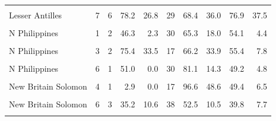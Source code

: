 \begin{ThreePartTable}
\begin{longtable}[t]{lrrrrrrrrr}
\cellcolor{gray!6}{Lesser Antilles} & \cellcolor{gray!6}{6} & \cellcolor{gray!6}{24} & \cellcolor{gray!6}{74.4} & \cellcolor{gray!6}{89.3} & \cellcolor{gray!6}{17} & \cellcolor{gray!6}{68.6} & \cellcolor{gray!6}{83.1} & \cellcolor{gray!6}{98.0} & \cellcolor{gray!6}{90.7}\\
Lesser Antilles & 7 & 6 & 78.2 & 26.8 & 29 & 68.4 & 36.0 & 76.9 & 37.5\\
\cellcolor{gray!6}{Lesser Antilles} & \cellcolor{gray!6}{8} & \cellcolor{gray!6}{14} & \cellcolor{gray!6}{54.5} & \cellcolor{gray!6}{32.0} & \cellcolor{gray!6}{47} & \cellcolor{gray!6}{64.9} & \cellcolor{gray!6}{21.0} & \cellcolor{gray!6}{60.3} & \cellcolor{gray!6}{27.8}\\
N Philippines & 1 & 2 & 46.3 & 2.3 & 30 & 65.3 & 18.0 & 54.1 & 4.4\\
\cellcolor{gray!6}{N Philippines} & \cellcolor{gray!6}{2} & \cellcolor{gray!6}{3} & \cellcolor{gray!6}{44.0} & \cellcolor{gray!6}{3.3} & \cellcolor{gray!6}{20} & \cellcolor{gray!6}{71.6} & \cellcolor{gray!6}{26.2} & \cellcolor{gray!6}{54.7} & \cellcolor{gray!6}{6.5}\\
N Philippines & 3 & 2 & 75.4 & 33.5 & 17 & 66.2 & 33.9 & 55.4 & 7.8\\
\cellcolor{gray!6}{N Philippines} & \cellcolor{gray!6}{4} & \cellcolor{gray!6}{5} & \cellcolor{gray!6}{23.0} & \cellcolor{gray!6}{7.0} & \cellcolor{gray!6}{33} & \cellcolor{gray!6}{75.7} & \cellcolor{gray!6}{34.2} & \cellcolor{gray!6}{48.2} & \cellcolor{gray!6}{11.0}\\
N Philippines & 6 & 1 & 51.0 & 0.0 & 30 & 81.1 & 14.3 & 49.2 & 4.8\\
\cellcolor{gray!6}{New Britain Solomon} & \cellcolor{gray!6}{3} & \cellcolor{gray!6}{1} & \cellcolor{gray!6}{37.7} & \cellcolor{gray!6}{0.0} & \cellcolor{gray!6}{26} & \cellcolor{gray!6}{83.2} & \cellcolor{gray!6}{24.9} & \cellcolor{gray!6}{48.5} & \cellcolor{gray!6}{3.8}\\
New Britain Solomon & 4 & 1 & 2.9 & 0.0 & 17 & 96.6 & 48.6 & 49.4 & 6.5\\
\cellcolor{gray!6}{New Britain Solomon} & \cellcolor{gray!6}{5} & \cellcolor{gray!6}{3} & \cellcolor{gray!6}{36.8} & \cellcolor{gray!6}{12.1} & \cellcolor{gray!6}{68} & \cellcolor{gray!6}{58.8} & \cellcolor{gray!6}{29.3} & \cellcolor{gray!6}{44.7} & \cellcolor{gray!6}{8.7}\\
New Britain Solomon & 6 & 3 & 35.2 & 10.6 & 38 & 52.5 & 10.5 & 39.8 & 7.7\\
\cellcolor{gray!6}{New Britain Solomon} & \cellcolor{gray!6}{8} & \cellcolor{gray!6}{1} & \cellcolor{gray!6}{58.2} & \cellcolor{gray!6}{0.0} & \cellcolor{gray!6}{19} & \cellcolor{gray!6}{56.6} & \cellcolor{gray!6}{27.8} & \cellcolor{gray!6}{49.1} & \cellcolor{gray!6}{19.2}\\

\end{longtable}
\end{ThreePartTable}

